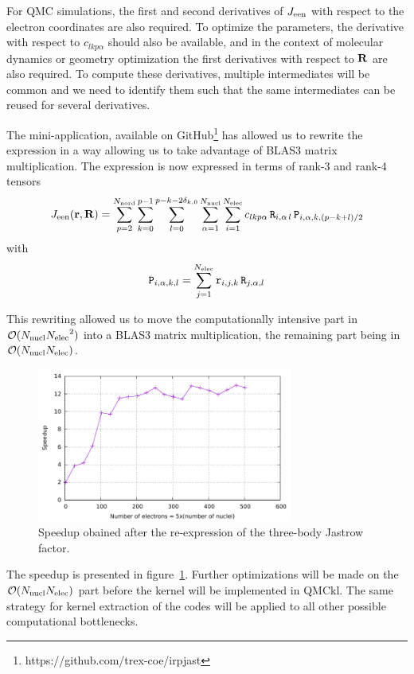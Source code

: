 For \ac{QMC} simulations, the first and second derivatives of $J_{\text{een}}$ with
respect to the electron coordinates are also required. To optimize the
parameters, the derivative with respect to $c_{lkp\alpha}$
should also be available, and in the context of molecular dynamics or
geometry optimization the first derivatives with respect to $\mathbf{R}$ are
also required. To compute these derivatives, multiple intermediates
will be common and we need to identify them such that the same
intermediates can be reused for several derivatives.

The mini-application, available on
GitHub\footnote{https://github.com/trex-coe/irpjast} has allowed us to
rewrite the expression in a way allowing us to take advantage of BLAS3
matrix multiplication. The expression is now expressed in terms of
rank-3 and rank-4 tensors \newcommand{\tr}{\mathtt{r}}
\newcommand{\tR}{\mathtt{R}}
\newcommand{\tP}{\mathtt{P}}
\[
  \Jeen(\br,\bR) = 
  \sum_{p=2}^{\Nord}\sum_{k=0}^{p-1}
  \sum_{l=0}^{\lmax} 
    \sum_{\alpha=1}^{\Nat}
    \sum_{i=1}^{\Nel}
    c_{lkp\alpha}\, {\tR}_{i,\alpha\,l}\,
  {\tP}_{i,\alpha,k,(p-k+l)/2}
  \]
with 
  \[
  {\tP}_{i, \alpha, k, l} = \sum_{j=1}^{\Nel} {\tr}_{i,j,k}\,{\tR}_{j,\alpha,l}
  \]
  
This rewriting allowed us to move the computationally intensive part in
$\mathcal{O}(N_{\text{nucl}}{N_{\text{elec}}}^2)$ into a BLAS3 matrix multiplication, the
remaining part being in $\mathcal{O}(N_{\text{nucl}} N_{\text{elec}})$.
\begin{figure}[t]
  \begin{center}
  \includegraphics[width=0.75\textwidth]{speedup.pdf}
  \end{center}
  \caption{\label{fig:speedup}Speedup obained after the re-expression of the three-body
    Jastrow factor.}
\end{figure}
The speedup is presented in figure~\ref{fig:speedup}. Further
optimizations will be made on the $\mathcal{O}(N_{\text{nucl}} N_{\text{elec}})$ part before
the kernel will be implemented in \ac{QMCkl}.
The same strategy for kernel extraction of the codes will be applied
to all other possible computational bottlenecks.


